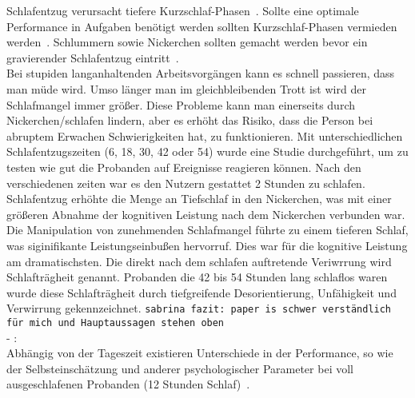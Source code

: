 Schlafentzug verursacht tiefere Kurzschlaf-Phasen~\cite{dinges1985assessing}. Sollte eine optimale Performance in Aufgaben benötigt werden sollten Kurzschlaf-Phasen vermieden werden~\cite{dinges1985assessing}. Schlummern sowie Nickerchen sollten gemacht werden bevor ein gravierender Schlafentzug eintritt~\cite{dinges1985assessing}.\\
Bei stupiden langanhaltenden Arbeitsvorgängen kann es schnell passieren, dass man müde wird. Umso länger man im gleichbleibenden Trott ist wird der Schlafmangel immer größer. Diese Probleme kann man einerseits durch Nickerchen/schlafen lindern, aber es erhöht das Risiko, dass die Person bei abruptem Erwachen Schwierigkeiten hat, zu funktionieren. Mit unterschiedlichen Schlafentzugszeiten (6, 18, 30, 42 oder 54) wurde eine Studie durchgeführt, um zu testen wie gut die Probanden auf Ereignisse reagieren können. Nach den verschiedenen zeiten war es den Nutzern gestattet 2 Stunden zu schlafen. Schlafentzug erhöhte die Menge an Tiefschlaf in den Nickerchen, was mit einer größeren Abnahme der kognitiven Leistung nach dem Nickerchen verbunden war.\\
Die Manipulation von zunehmenden Schlafmangel führte zu einem tieferen Schlaf, was siginifikante Leistungseinbußen hervorruf. Dies war für die kognitive Leistung am dramatischsten. Die direkt nach dem schlafen auftretende Veriwrrung wird Schlafträgheit genannt. Probanden die 42 bis 54 Stunden lang schlaflos waren wurde diese Schlafträgheit durch tiefgreifende Desorientierung, Unfähigkeit und Verwirrung gekennzeichnet.
\texttt{sabrina fazit: paper is schwer verständlich für mich und Hauptaussagen stehen oben}\\

- \cite{kraemer2000time}:\\

Abhängig von der Tageszeit existieren Unterschiede in der Performance, so wie der Selbsteinschätzung und anderer psychologischer Parameter bei voll ausgeschlafenen Probanden (12 Stunden Schlaf)~\cite{kraemer2000time}.\\

